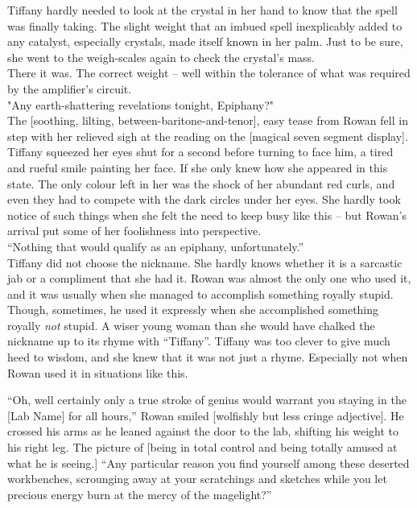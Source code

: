 Tiffany hardly needed to look at the crystal in her hand to know that the spell was finally taking.
The slight weight that an imbued spell inexplicably added to any catalyst, especially crystals, made itself known in her palm.
Just to be sure, she went to the weigh-scales again to check the crystal's mass.\\

There it was.
The correct weight -- well within the tolerance of what was required by the amplifier's circuit.\\

"Any earth-shattering revelations tonight, Epiphany?"\\

The [soothing, lilting, between-baritone-and-tenor], easy tease from Rowan fell in step with her relieved sigh at the reading on the [magical seven segment display].
Tiffany squeezed her eyes shut for a second before turning to face him, a tired and rueful smile painting her face.
If she only knew how she appeared in this state.
The only colour left in her was the shock of her abundant red curls, and even they had to compete with the dark circles under her eyes.
She hardly took notice of such things when she felt the need to keep busy like this -- but Rowan's arrival put some of her foolishness into perspective.\\

``Nothing that would qualify as an epiphany, unfortunately.''\\

Tiffany did not choose the nickname.
She hardly knows whether it is a sarcastic jab or a compliment that she had it.
Rowan was almost the only one who used it, and it was usually when she managed to accomplish something royally stupid.
Though, sometimes, he used it expressly when she accomplished something royally \textit{not} stupid. 
A wiser young woman than she would have chalked the nickname up to its rhyme with ``Tiffany''.
Tiffany was too clever to give much heed to wisdom, and she knew that it was not just a rhyme.
Especially not when Rowan used it in situations like this.

``Oh, well certainly only a true stroke of genius would warrant you staying in the [Lab Name] for all hours,'' Rowan smiled [wolfishly but less cringe adjective].
He crossed his arms as he leaned against the door to the lab, shifting his weight to his right leg.
The picture of [being in total control and being totally amused at what he is seeing.]
``Any particular reason you find yourself among these deserted workbenches, scrounging away at your scratchings and sketches while you let precious energy burn at the mercy of the magelight?''\\

